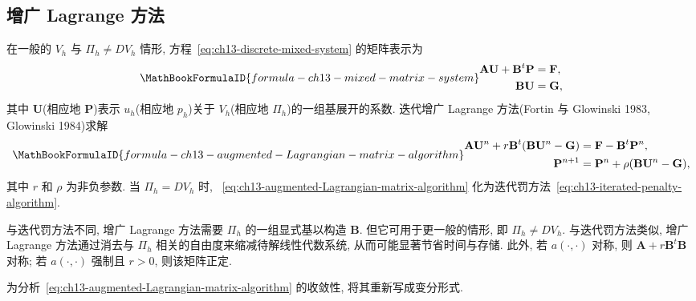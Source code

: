 \subsection{增广 Lagrange 方法}
\label{sec:ch13-augmented-Lagrangian-method}
\setcounter{thmcount}{0}
\setcounter{equation}{0}

在一般的 $V_h$ 与 $\Pi_h\neq DV_h$ 情形, 方程~\eqref{eq:ch13-discrete-mixed-system} 的矩阵表示为
\[
\MathBookFormulaID{formula-ch13-mixed-matrix-system}
\begin{aligned}
\mathbf A\mathbf U+\mathbf B^t\mathbf P&=\mathbf F,\\
\mathbf B\mathbf U&=\mathbf G,
\end{aligned}
\]
其中 $\mathbf U$(相应地 $\mathbf P$)表示 $u_h$(相应地 $p_h$)关于 $V_h$(相应地 $\Pi_h$)的一组基展开的系数. 迭代增广 Lagrange 方法(Fortin 与 Glowinski 1983, Glowinski 1984)求解
\begin{equation}
\MathBookFormulaID{formula-ch13-augmented-Lagrangian-matrix-algorithm}
\label{eq:ch13-augmented-Lagrangian-matrix-algorithm}
\begin{aligned}
\mathbf A\mathbf U^n+r\mathbf B^t(\mathbf B\mathbf U^n-\mathbf G)
&=\mathbf F-\mathbf B^t\mathbf P^n,\\
\mathbf P^{n+1}&=\mathbf P^n+\rho(\mathbf B\mathbf U^n-\mathbf G),
\end{aligned}
\end{equation}
其中 $r$ 和 $\rho$ 为非负参数. 当 $\Pi_h=DV_h$ 时, ~\eqref{eq:ch13-augmented-Lagrangian-matrix-algorithm} 化为迭代罚方法~\eqref{eq:ch13-iterated-penalty-algorithm}.

与迭代罚方法不同, 增广 Lagrange 方法需要 $\Pi_h$ 的一组显式基以构造 $\mathbf B$. 但它可用于更一般的情形, 即 $\Pi_h\neq DV_h$. 与迭代罚方法类似, 增广 Lagrange 方法通过消去与 $\Pi_h$ 相关的自由度来缩减待解线性代数系统, 从而可能显著节省时间与存储. 此外, 若 $a(\cdot,\cdot)$ 对称, 则 $\mathbf A+r\mathbf B^t\mathbf B$ 对称; 若 $a(\cdot,\cdot)$ 强制且 $r>0$, 则该矩阵正定.

为分析~\eqref{eq:ch13-augmented-Lagrangian-matrix-algorithm} 的收敛性, 将其重新写成变分形式.


